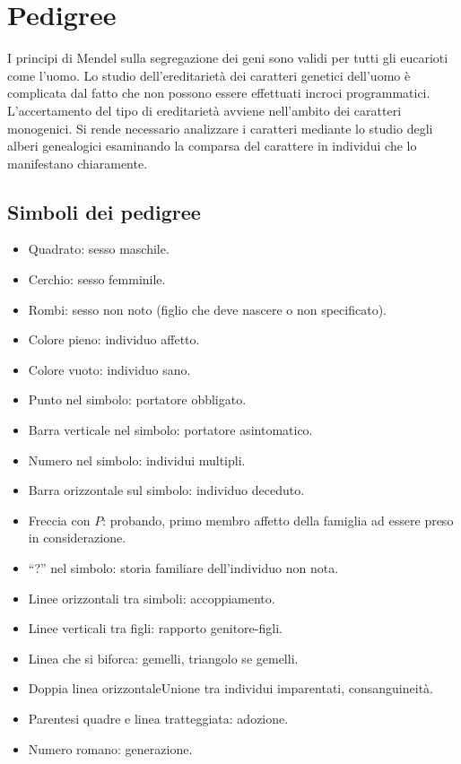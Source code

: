 \chapter{Pedigree}
I principi di Mendel sulla segregazione dei geni sono validi per tutti gli eucarioti come l'uomo. Lo studio dell'ereditariet\`a dei caratteri genetici dell'uomo \`e complicata dal
fatto che non possono essere effettuati incroci programmatici. L'accertamento del tipo di ereditariet\`a avviene nell'ambito dei caratteri monogenici. Si rende necessario analizzare
i caratteri mediante lo studio degli alberi genealogici esaminando la comparsa del carattere in individui che lo manifestano chiaramente. 
\section{Simboli dei pedigree}
\begin{multicols}{2}
	\begin{itemize}
		\item Quadrato: sesso maschile.
		\item Cerchio: sesso femminile.
		\item Rombi: sesso non noto (figlio che deve nascere o non specificato).
		\item Colore pieno: individuo affetto.
		\item Colore vuoto: individuo sano.
		\item Punto nel simbolo: portatore obbligato.
		\item Barra verticale nel simbolo: portatore asintomatico.
		\item Numero nel simbolo: individui multipli.
		\item Barra orizzontale sul simbolo: individuo deceduto.
		\item Freccia con $P$: probando, primo membro affetto della famiglia ad essere preso in considerazione.
		\item ``?'' nel simbolo: storia familiare dell'individuo non nota. 
		\item Linee orizzontali tra simboli: accoppiamento.
		\item Linee verticali tra figli: rapporto genitore-figli.
		\item Linea che si biforca: gemelli, triangolo se gemelli.
		\item Doppia linea orizzontaleUnione tra individui imparentati, consanguineit\`a.
		\item Parentesi quadre e linea tratteggiata: adozione.
		\item Numero romano: generazione. 
	\end{itemize}
\end{multicols}

